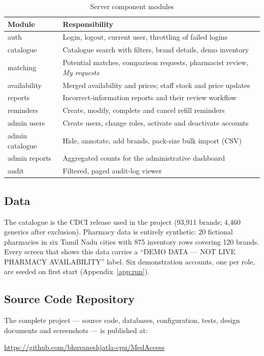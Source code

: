 \documentclass[11pt,a4paper]{article}
\newcommand{\repolink}{\url{https://github.com/bhuvaneshjatla-cpu/MedAccess}}
\begin{document}
\begin{table}[H]
\caption{Server component modules}
\label{tab:modules}
\centering
\small
\begin{tabularx}{\textwidth}{@{}lX@{}}
\toprule
Module & Responsibility \\
\midrule
auth            & Login, logout, current user, throttling of failed logins \\
catalogue       & Catalogue search with filters, brand details, demo inventory \\
matching        & Potential matches, comparison requests, pharmacist review, \emph{My requests} \\
availability    & Merged availability and prices; staff stock and price updates \\
reports         & Incorrect-information reports and their review workflow \\
reminders       & Create, modify, complete and cancel refill reminders \\
admin users     & Create users, change roles, activate and deactivate accounts \\
admin catalogue & Hide, annotate, add brands, pack-size bulk import (CSV) \\
admin reports   & Aggregated counts for the administrative dashboard \\
audit           & Filtered, paged audit-log viewer \\
\bottomrule
\end{tabularx}
\end{table}

\subsection{Data}
The catalogue is the CDCI release used in the project (93{,}911 brands; 4{,}460 generics after exclusion). Pharmacy data is entirely synthetic: 20 fictional pharmacies in six Tamil Nadu cities with 875 inventory rows covering 120 brands. Every screen that shows this data carries a ``DEMO DATA --- NOT LIVE PHARMACY AVAILABILITY'' label. Six demonstration accounts, one per role, are seeded on first start (Appendix~\ref{app:run}).

\subsection{Source Code Repository}
The complete project --- source code, databases, configuration, tests, design documents and screenshots --- is published at:
\begin{center}
\repolink{}
\end{center}
\end{document}
